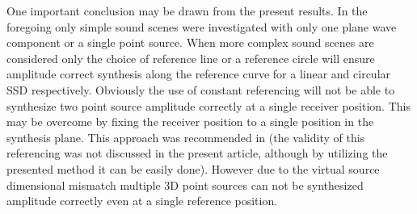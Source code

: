 \documentclass[12pt,a4paper]{article}
\begin{document}
One important conclusion may be drawn from the present results. In the foregoing only simple sound scenes were investigated with only one plane wave component or a single point source. When more complex sound scenes are considered only the choice of  reference line or a reference circle will ensure amplitude correct synthesis along the reference curve for a linear and circular SSD respectively. Obviously the use of constant referencing will not be able to synthesize two point source amplitude correctly at a single receiver position. This may be overcome by fixing the receiver position to a single position in the synthesis plane. This approach was recommended in \cite{Spors2008:WFSrevisited} (the validity of this referencing was not discussed in the present article, although by utilizing the presented method it can be easily done). However due to the virtual source dimensional mismatch multiple 3D point sources can not be synthesized amplitude correctly even at a single reference position.



\end{document}
